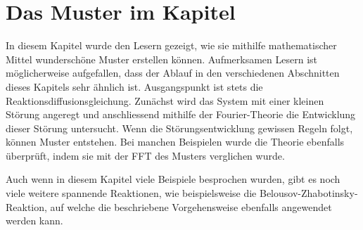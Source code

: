 %
%
%
%




\section{Das Muster im Kapitel}

In diesem Kapitel wurde den Lesern gezeigt, wie sie mithilfe mathematischer Mittel wunderschöne Muster erstellen können.
Aufmerksamen Lesern ist möglicherweise aufgefallen, dass der Ablauf in den verschiedenen Abschnitten dieses Kapitels sehr ähnlich ist.
Ausgangspunkt ist stets die Reaktionsdiffusionsgleichung.
Zunächst wird das System mit einer kleinen Störung angeregt und anschliessend mithilfe der Fourier-Theorie die Entwicklung dieser Störung untersucht.
Wenn die Störungsentwicklung gewissen Regeln folgt, können Muster entstehen.
Bei manchen Beispielen wurde die Theorie ebenfalls überprüft, indem sie mit der FFT des Musters verglichen wurde.

Auch wenn in diesem Kapitel viele Beispiele besprochen wurden, gibt es noch viele weitere spannende Reaktionen, wie beispielsweise die Belousov-Zhabotinsky-Reaktion, auf welche die beschriebene Vorgehensweise ebenfalls angewendet werden kann.
